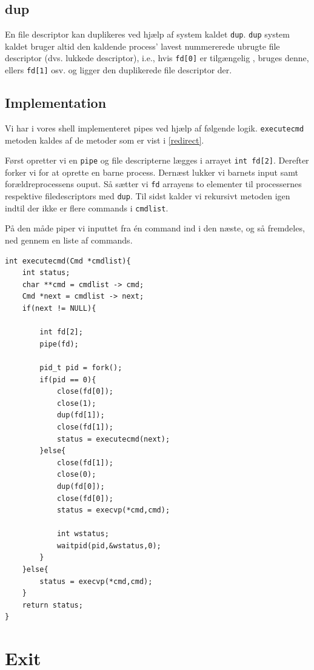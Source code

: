 \documentclass[danish]{report}
\begin{document}
\subsection{dup}
En file descriptor kan duplikeres ved hjælp af system kaldet {\tt dup}. {\tt dup} system kaldet bruger altid den kaldende process' lavest nummererede ubrugte file descriptor (dvs. lukkede descriptor), i.e., hvis {\tt fd[0]} er tilgængelig , bruges denne, ellers {\tt fd[1]} osv. og ligger den duplikerede file descriptor der.

\subsection{Implementation}
Vi har i vores shell implementeret pipes ved hjælp af følgende logik. {\tt executecmd} metoden kaldes af de metoder som er vist i \ref{redirect}.

Først opretter vi en {\tt pipe} og file descripterne lægges i arrayet {\tt int fd[2]}. Derefter forker vi for at oprette en barne process. Dernæst lukker vi barnets input samt forældreprocessens ouput. Så sætter vi {\tt fd} arrayens to elementer til processernes respektive filedescriptors med {\tt dup}. Til sidst kalder vi rekursivt metoden igen indtil der ikke er flere commands i {\tt cmdlist}. 

På den måde piper vi inputtet fra én command ind i den næste, og så fremdeles, ned gennem en liste  af commands. 


\begin{lstlisting}
int executecmd(Cmd *cmdlist){
    int status;
    char **cmd = cmdlist -> cmd;
    Cmd *next = cmdlist -> next;
    if(next != NULL){

        int fd[2];
        pipe(fd);

        pid_t pid = fork();
        if(pid == 0){
            close(fd[0]);
            close(1);
            dup(fd[1]);
            close(fd[1]);
            status = executecmd(next);
        }else{
            close(fd[1]);
            close(0);
            dup(fd[0]);
            close(fd[0]);
            status = execvp(*cmd,cmd);
            
            int wstatus;
            waitpid(pid,&wstatus,0);
        }
    }else{
        status = execvp(*cmd,cmd);
    }
    return status;
}

\end{lstlisting}

\section{Exit}
\end{document}
